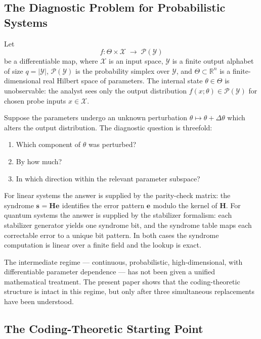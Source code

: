 \documentclass[11pt,a4paper]{article}
\theoremstyle{definition}
\newcommand{\Hm}{\mathbf{H}}
\newcommand{\sk}[1][]{\mathbf{s}_{#1}}
\newcommand{\ek}[1][]{\mathbf{e}_{#1}}
\newcommand{\Rbb}{\mathbb{R}}
\begin{document}
\subsection{The Diagnostic Problem for Probabilistic Systems}
\label{sec:intro_problem}

Let
\begin{equation}
  f: \Theta \times \mathcal{X} \;\longrightarrow\; \mathcal{P}(\mathcal{Y})
  \label{eq:bb_intro}
\end{equation}
be a differentiable map, where $\mathcal{X}$ is an input space, $\mathcal{Y}$ is a finite output alphabet of size $q = |\mathcal{Y}|$, $\mathcal{P}(\mathcal{Y})$ is the probability simplex over $\mathcal{Y}$, and $\Theta \subset \Rbb^n$ is a finite-dimensional real Hilbert space of parameters. The internal state $\theta\in\Theta$ is unobservable: the analyst sees only the output distribution $f(x;\theta)\in\mathcal{P}(\mathcal{Y})$ for chosen probe inputs $x\in\mathcal{X}$.

Suppose the parameters undergo an unknown perturbation $\theta \mapsto \theta + \Delta\theta$ which alters the output distribution. The diagnostic question is threefold:
\begin{enumerate}[nosep,label=(\roman*)]
  \item Which component of $\theta$ was perturbed?
  \item By how much?
  \item In which direction within the relevant parameter subspace?
\end{enumerate}
For linear systems the answer is supplied by the parity-check matrix: the syndrome $\sk = \Hm\ek$ identifies the error pattern $\ek$ modulo the kernel of $\Hm$. For quantum systems the answer is supplied by the stabilizer formalism: each stabilizer generator yields one syndrome bit, and the syndrome table maps each correctable error to a unique bit pattern. In both cases the syndrome computation is linear over a finite field and the lookup is exact.

The intermediate regime --- continuous, probabilistic, high-dimensional, with differentiable parameter dependence --- has not been given a unified mathematical treatment. The present paper shows that the coding-theoretic structure is intact in this regime, but only after three simultaneous replacements have been understood.

\subsection{The Coding-Theoretic Starting Point}
\label{sec:intro_start}
\end{document}
